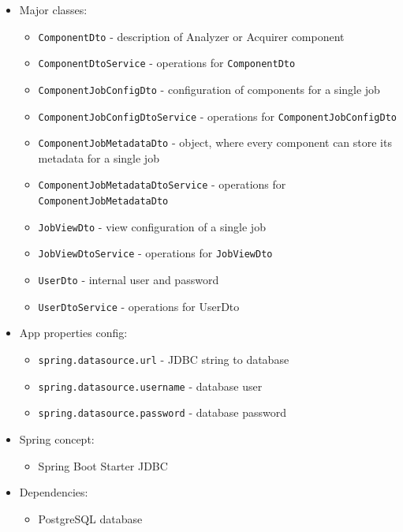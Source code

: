 \begin{itemize}
    \item Major classes:
        \begin{itemize}
            \item \texttt{ComponentDto} - description of Analyzer or Acquirer component
            \item \texttt{ComponentDtoService} - operations for \texttt{ComponentDto}
            \item \texttt{ComponentJobConfigDto} - configuration of components for a single job
            \item \texttt{ComponentJobConfigDtoService} - operations for \texttt{ComponentJobConfigDto}
            \item \texttt{ComponentJobMetadataDto} - object, where every component can store its metadata for a single job
            \item \texttt{ComponentJobMetadataDtoService} - operations for \texttt{ComponentJobMetadataDto}
            \item \texttt{JobViewDto} - view configuration of a single job 
            \item \texttt{JobViewDtoService} - operations for \texttt{JobViewDto}
            \item \texttt{UserDto} - internal user and password
            \item \texttt{UserDtoService} - operations for UserDto
        \end{itemize}
    \item App properties config:
        \begin{itemize}
            \item \texttt{spring.datasource.url} - JDBC string to database
            \item \texttt{spring.datasource.username} - database user
            \item \texttt{spring.datasource.password} - database password
        \end{itemize}
    \item Spring concept:
        \begin{itemize}
            \item Spring Boot Starter JDBC
        \end{itemize}
    \item Dependencies:
        \begin{itemize}
            \item PostgreSQL database
        \end{itemize}
\end{itemize}

